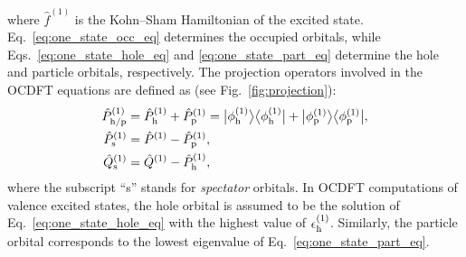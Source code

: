 \documentclass[12pt]{article}
\newcommand{\bra}[2][0]
{\ifthenelse{\equal{#1}{0}}{\left\langle #2 \right|}
{\ifthenelse{\equal{#1}{1}}{\big\langle #2 \big|}
{\ifthenelse{\equal{#1}{2}}{\Big\langle #2 \Big|}
{\ifthenelse{\equal{#1}{3}}{\bigg\langle #2 \bigg|}
{\ifthenelse{\equal{#1}{4}}{\Bigg\langle #2 \Bigg|}
{Error}}}}}
}
\newcommand{\ket}[2][0]
{\ifthenelse{\equal{#1}{0}}{\left| #2 \right\rangle}
{\ifthenelse{\equal{#1}{1}}{\big| #2 \big\rangle}
{\ifthenelse{\equal{#1}{2}}{\Big| #2 \Big\rangle}
{\ifthenelse{\equal{#1}{3}}{\bigg| #2 \bigg\rangle}
{\ifthenelse{\equal{#1}{4}}{\Bigg| #2 \Bigg\rangle}
{Error}}}}}
}
\begin{document}
where $\hat{f}^{(1)} $ is the Kohn--Sham Hamiltonian of the excited state.
Eq.~\eqref{eq:one_state_occ_eq} determines the occupied orbitals, while Eqs.~\eqref{eq:one_state_hole_eq} and \eqref{eq:one_state_part_eq} determine the hole and particle orbitals, respectively.
The projection operators involved in the OCDFT equations are defined as (see Fig.~\ref{fig:projection}):
\begin{align}
\hat{P}^{(1)}_{\rm h/p} &= \hat{P}^{(1)}_{\rm h} + \hat{P}^{(1)}_{\rm p} = 
\ket[1]{\phi^{(1)}_{\rm h}}\bra[1]{\phi^{(1)}_{\rm h}}
+\ket[1]{\phi^{(1)}_{\rm p}}\bra[1]{\phi^{(1)}_{\rm p}},\\
\hat{P}^{(1)}_{\rm s} &= \hat{P}^{(1)} - \hat{P}^{(1)}_{\rm p},\\
\hat{Q}^{(1)}_{\rm s} &= \hat{Q}^{(1)} - \hat{P}^{(1)}_{\rm h},
\end{align}
where the subscript ``s'' stands for \textit{spectator} orbitals.
In OCDFT computations of valence excited states, the hole orbital is assumed to be the solution of Eq.~\eqref{eq:one_state_hole_eq} with the highest value of $\epsilon^{(1)}_{\rm h}$.  Similarly, the particle orbital corresponds to the lowest eigenvalue of Eq.~\eqref{eq:one_state_part_eq}.
\end{document}
